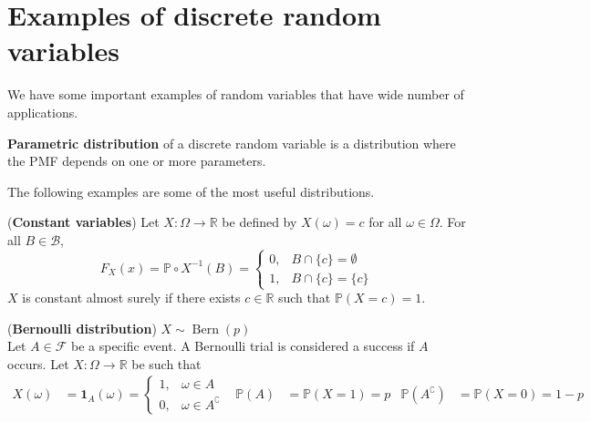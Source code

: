 \documentclass{huhtakm-template-book}
\newcommand{\prob}{\mathbb{P}}
\DeclareMathOperator{\Bern}{Bern}
\begin{document}
\section{Examples of discrete random variables}
We have some important examples of random variables that have wide number of applications.
\begin{defn}
	\textbf{Parametric distribution} of a discrete random variable is a distribution where the PMF depends on one or more parameters.
\end{defn}
The following examples are some of the most useful distributions.
\begin{eg}(\textbf{Constant variables})
	Let $X:\Omega\to\mathbb{R}$ be defined by $X(\omega)=c$ for all $\omega\in\Omega$. For all $B\in\mathcal{B}$,
	\begin{equation*}
		F_{X}(x)=\prob\circ X^{-1}(B)=\begin{cases}
			0, &B\cap\{c\}=\emptyset\\
			1, &B\cap\{c\}=\{c\}
		\end{cases}
	\end{equation*}
	$X$ is constant almost surely if there exists $c\in\mathbb{R}$ such that $\prob(X=c)=1$.
\end{eg}
\begin{eg}(\textbf{Bernoulli distribution}) $X\sim \Bern(p)$\\
	Let $A\in\mathcal{F}$ be a specific event. A Bernoulli trial is considered a success if $A$ occurs. Let $X:\Omega\to\mathbb{R}$ be such that
	\begin{align*}
		X(\omega)&=\mathbf{1}_{A}(\omega)=\begin{cases}
			1, &\omega\in A\\
			0, &\omega\in A^{\complement}
		\end{cases} & \prob(A)&=\prob(X=1)=p & \prob(A^{\complement})&=\prob(X=0)=1-p
	\end{align*}
\end{eg}
\end{document}
